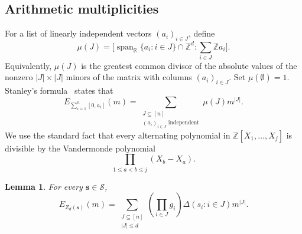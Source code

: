 \documentclass[a4paper,reqno,11pt,oneside]{amsart}
\newcommand{\Sc}{\mathcal{S}}
\newcommand{\ZZ}{\mathbb{Z}}
\newcommand{\RR}{\mathbb{R}}
\newtheorem{lem}[thm]{Lemma}
\theoremstyle{definition}
\theoremstyle{remark}
\begin{document}
\subsection{Arithmetic multiplicities}

For a list of linearly independent vectors $(a_i)_{i\in J}$,
define
\[
\mu(J)=\bigl[\operatorname{span}_{\RR}\{a_i:i\in J\}\cap\ZZ^d:\sum_{i\in J}\ZZ a_i\bigr].
\]
Equivalently, $\mu(J)$ is the greatest common divisor of the absolute values of the nonzero $|J|\times|J|$ minors of the matrix with columns $(a_i)_{i\in J}$. Set $\mu(\emptyset)=1$. Stanley's formula~\cite[Theorem~2.2]{stanley1991zonotope} states that
\begin{equation}\label{eq:stanley}
    E_{\sum_{i=1}^n[0,a_i]}(m)
    =\sum_{\substack{J\subseteq[n]\\(a_i)_{i\in J}\text{ independent}}} \mu(J)m^{|J|}.
\end{equation}
We use the standard fact that every alternating polynomial in $\ZZ[X_1,\ldots,X_j]$ is divisible by the Vandermonde polynomial
\[
\prod_{1\le a<b\le j}(X_b-X_a).
\]

\begin{lem}\label{lem:zonotope-coefficients}
For every $\mathbf s\in\Sc$,
\begin{equation}\label{eq:zonotope-coefficients}
    E_{Z_d(\mathbf s)}(m)= \sum_{\substack{J\subseteq[n]\\|J|\le d}} \left(\prod_{i\in J}g_i\right) \Delta(s_i:i\in J)m^{|J|}.
\end{equation}
\end{lem}
\end{document}

